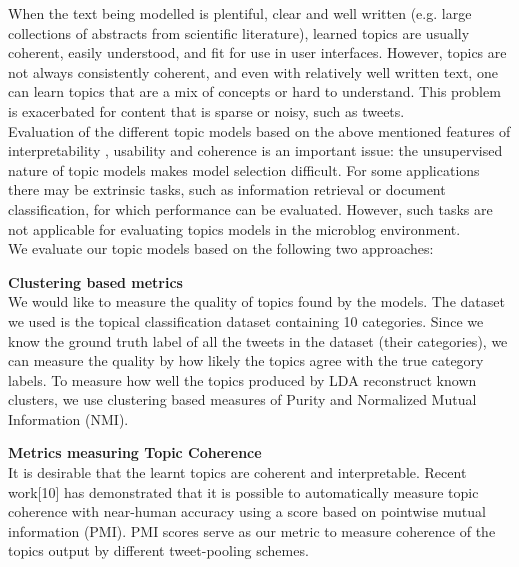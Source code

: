 \documentclass[10pt,a5paper,twoside]{article}
\begin{document}
When the text being modelled is plentiful, clear and well written (e.g. large
collections of abstracts from scientific literature), learned topics are usually coherent, easily understood, and fit for use in user interfaces. However, topics are not always consistently coherent, and even with relatively well written text, one can learn topics that are a mix of concepts or hard to understand. This problem is exacerbated for content that is sparse or noisy, such as tweets.
\\
Evaluation of the different topic models based on the above mentioned features of interpretability , usability and coherence is an important issue: the unsupervised nature of topic models makes model selection difficult. For some applications there may be extrinsic tasks, such as information retrieval or document classification, for which performance can be evaluated. However, such tasks are not applicable for evaluating topics models in the microblog environment. 
\\
We evaluate our topic models based on the following two approaches:
\begin{compactenum}
\item \textbf{Clustering based metrics} \\
We would like to measure the quality of topics found by the models. The dataset we used is the topical classification dataset containing 10 categories. Since we know the ground truth label of all the tweets in the dataset (their categories), we can measure the quality by how likely the topics agree with the true category labels. To measure how well the topics produced by LDA reconstruct known clusters, we use clustering based measures of Purity and Normalized Mutual Information (NMI).\\
\item \textbf{Metrics measuring Topic Coherence} \\
It is desirable that the learnt topics are coherent and interpretable. Recent work[10] has demonstrated that it is possible to automatically measure topic coherence with near-human accuracy using a score based on pointwise mutual information (PMI). PMI scores serve as our metric to measure coherence of the topics output by different tweet-pooling schemes.
\end{compactenum}
\end{document}
